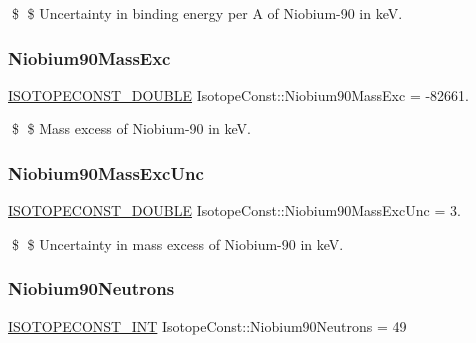 \$ \$ Uncertainty in binding energy per A of Niobium-\/90 in keV. \mbox{\label{group___isotope_const-_niobium-_nb90_gac33e0d9402a8aad9fc882e351d847908}} 
\subsubsection{\texorpdfstring{Niobium90\+Mass\+Exc}{Niobium90MassExc}}
{\footnotesize\ttfamily \mbox{\hyperlink{group___isotope_const-_macros_ga8f45a7272ce02c0b4c65c44636ed719a}{I\+S\+O\+T\+O\+P\+E\+C\+O\+N\+S\+T\+\_\+\+D\+O\+U\+B\+LE}} Isotope\+Const\+::\+Niobium90\+Mass\+Exc = -\/82661.}

\$ \$ Mass excess of Niobium-\/90 in keV. \mbox{\label{group___isotope_const-_niobium-_nb90_gac32288b25d8a1284740b5736a1dfcd3c}} 
\subsubsection{\texorpdfstring{Niobium90\+Mass\+Exc\+Unc}{Niobium90MassExcUnc}}
{\footnotesize\ttfamily \mbox{\hyperlink{group___isotope_const-_macros_ga8f45a7272ce02c0b4c65c44636ed719a}{I\+S\+O\+T\+O\+P\+E\+C\+O\+N\+S\+T\+\_\+\+D\+O\+U\+B\+LE}} Isotope\+Const\+::\+Niobium90\+Mass\+Exc\+Unc = 3.}

\$ \$ Uncertainty in mass excess of Niobium-\/90 in keV. \mbox{\label{group___isotope_const-_niobium-_nb90_ga27aec4cca65f318c8c5730aab20ce848}} 
\subsubsection{\texorpdfstring{Niobium90\+Neutrons}{Niobium90Neutrons}}
{\footnotesize\ttfamily \mbox{\hyperlink{group___isotope_const-_macros_ga5f18360b3e99483a35c32d789e62621c}{I\+S\+O\+T\+O\+P\+E\+C\+O\+N\+S\+T\+\_\+\+I\+NT}} Isotope\+Const\+::\+Niobium90\+Neutrons = 49}


